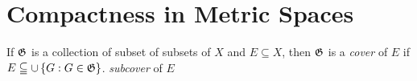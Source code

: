 \section*{Compactness in Metric Spaces}
If $\mathfrak{G}$ is a collection of subset of subsets of $X$ and $ E \subseteq X $, then $\mathfrak{G}$ is a \textit{cover } of $E$ if $ E \subseteqq  \cup\left\lbrace G : G \in \mathfrak{G} \right\rbrace$. \textit{subcover} of $E$